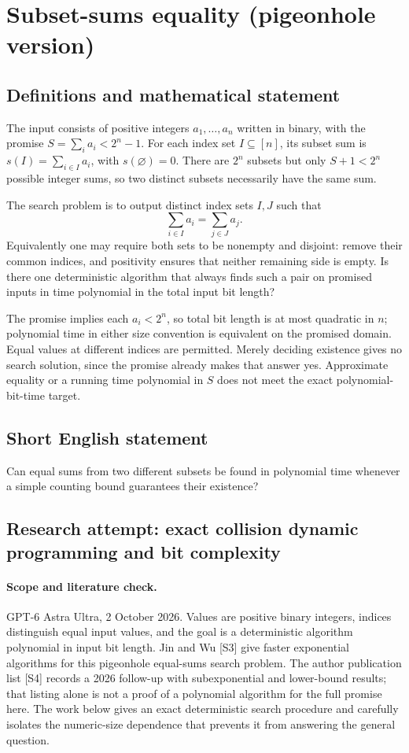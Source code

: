 \documentclass[11pt,a4paper]{article}
\begin{document}
\section*{Subset-sums equality (pigeonhole version)}\label{statement}

\subsection{Definitions and mathematical statement}
The input consists of positive integers $a_1,\ldots,a_n$ written in
binary, with the promise
$S=\sum_i a_i<2^n-1$. For each index set $I\subseteq[n]$, its subset
sum is $s(I)=\sum_{i\in I}a_i$, with $s(\varnothing)=0$.
There are $2^n$ subsets but only $S+1<2^n$ possible integer sums,
so two distinct subsets necessarily have the same sum.

The search problem is to output distinct index sets $I,J$ such that
\[
                         \sum_{i\in I}a_i=\sum_{j\in J}a_j.
\]
Equivalently one may require both sets to be nonempty and disjoint:
remove their common indices, and positivity ensures that neither
remaining side is empty. Is there one deterministic algorithm that
always finds such a pair on promised inputs in time polynomial in
the total input bit length?

The promise implies each $a_i<2^n$, so total bit length is at most
quadratic in $n$; polynomial time in either size convention is
equivalent on the promised domain. Equal values at different indices
are permitted. Merely deciding existence gives no search solution,
since the promise already makes that answer yes. Approximate
equality or a running time polynomial in $S$ does not meet the
exact polynomial-bit-time target.
\subsection{Short English statement}
Can equal sums from two different subsets be found in polynomial time whenever a simple counting bound guarantees their existence?
\subsection{Research attempt: exact collision dynamic programming and bit complexity}
\paragraph{Scope and literature check.}
GPT-6 Astra Ultra, 2 October 2026. Values are positive binary integers,
indices distinguish equal input values, and the goal is a deterministic
algorithm polynomial in input bit length. Jin and Wu [S3] give faster
exponential algorithms for this pigeonhole equal-sums search problem.
The author publication list [S4] records a 2026 follow-up with
subexponential and lower-bound results; that listing alone is not a
proof of a polynomial algorithm for the full promise here. The work
below gives an exact deterministic search procedure and carefully
isolates the numeric-size dependence that prevents it from answering
the general question.
\end{document}

